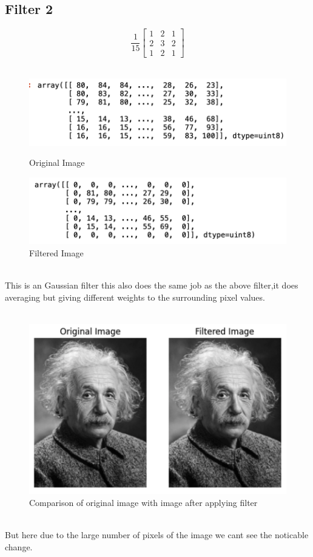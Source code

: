 \documentclass{assignment}
\begin{document}
\subsection{Filter 2}
\[
\frac{1}{15}\begin{bmatrix} 1 & 2 & 1 \\ 2 & 3 & 2 \\ 1 & 2 & 1 \end{bmatrix}
\]
\\
\begin{figure}[h]
  \begin{minipage}{0.5\textwidth}
    \centering
    \includegraphics[width=0.8\linewidth]{image.png}
    \caption{Original Image}
    \label{fig:original_image}
  \end{minipage}%
  \begin{minipage}{0.5\textwidth}
    \centering
    \includegraphics[width=0.8\linewidth]{f3_2.png}
    \caption{Filtered Image}
    \label{fig:filtered_image}
  \end{minipage}
\end{figure}
\\
This is an Gaussian filter this also does the same job as the above filter,it does averaging but giving different weights to the surrounding pixel values.
\\
\\
\begin{figure}[h]
    \centering
    \includegraphics[width=0.4\linewidth]{magic.png}
    \caption{Comparison of original image with image after applying filter}
    \label{fig:enter-label}
\end{figure}
\\
But here due to the large number of pixels of the image we cant see the noticable change.
\end{document}
